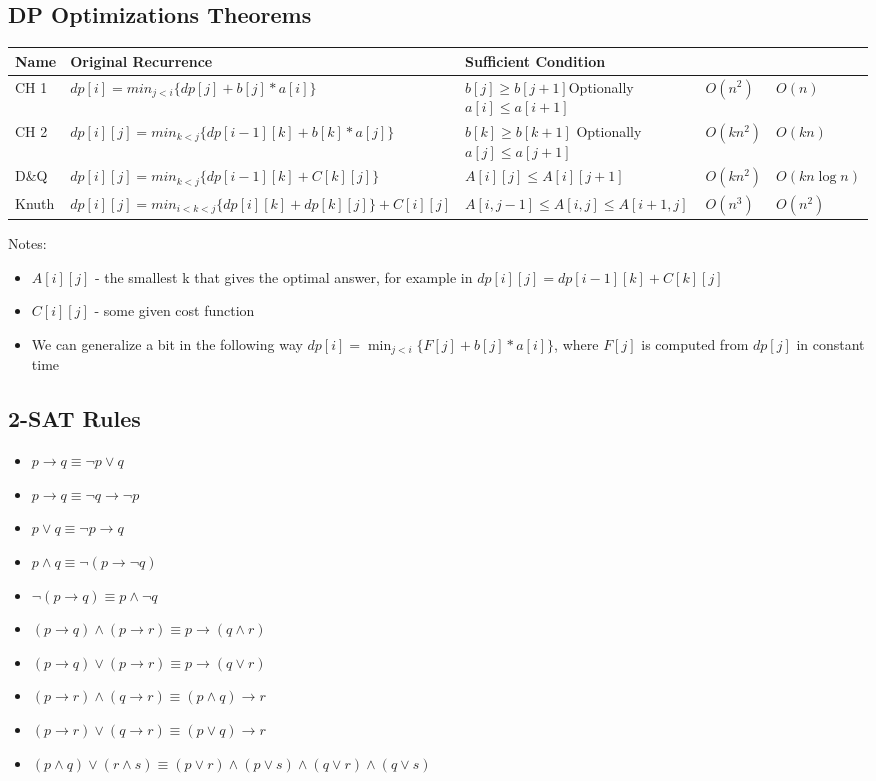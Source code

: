 \documentclass[10pt,letterpaper,twocolumn,twosided]{article}
\begin{document}
\subsection{DP Optimizations Theorems}
\begin{tabular}{|p{0.8cm}| p{4.5cm}| p{3.3cm}|p{0.9cm}| p{1.3cm}|}
	\hline
	Name & Original Recurrence & Sufficient Condition &  &  \\ 
	\hline
	CH 1 & $dp[i] = min_{j<i}\{dp[j] + b[j] * a[i]\}$ & $b[j] \geq b[j+1]$Optionally $a[i] \leq a[i+1]$ & $O(n^2)$ & $O(n)$ \\ 
	\hline
	CH 2 & $dp[i][j] = min_{k<j}\{dp[i-1][k] + b[k] * a[j]\}$ & $b[k] \geq b[k+1]$ Optionally $a[j] \leq a[j+1]$ & $O(kn^2)$ & $O(kn)$ \\ 
	\hline
	D\&Q & $dp[i][j] = min_{k<j}\{dp[i-1][k] + C[k][j]\}$ & $A[i][j] \leq A[i][j+1]$ & $O(kn^2)$ & $O(kn\log n)$ \\ 
	\hline
	Knuth & $dp[i][j] = min_{i<k<j}\{dp[i][k] + dp[k][j]\} + C[i][j]$ & $A[i, j -1] \leq A[i, j] \leq A[i+1, j]$ & $O(n^3)$ & $O(n^2)$ \\ 
	\hline
\end{tabular} 

Notes:

\begin{itemize}
	\item $A[i][j]$ - the smallest k that gives the optimal answer, for example in $dp[i][j] = dp[i-1][k] + C[k][j]$
	\item $C[i][j]$ - some given cost function
	\item We can generalize a bit in the following way $dp[i] = \min_{j<i}\{F[j]+b[j] * a[i]\}$, where $F[j]$ is computed from $dp[j]$ in constant time
\end{itemize}


\subsection{2-SAT Rules}

\begin{itemize}
	\item $ p \rightarrow q \equiv \lnot p \lor q$
	\item $ p \rightarrow q \equiv \lnot q \rightarrow \lnot p$
	\item $ p \lor q \equiv \lnot p \rightarrow q$
	\item $ p \land q \equiv \lnot (p \rightarrow \lnot q)$
	\item $ \lnot (p \rightarrow q) \equiv p \land \lnot q$
	\item $ (p \rightarrow q) \land (p \rightarrow r) \equiv p \rightarrow (q \land r)$
	\item $ (p \rightarrow q) \lor (p \rightarrow r) \equiv p \rightarrow (q \lor r)$
	\item $ (p \rightarrow r) \land (q \rightarrow r) \equiv (p \land q) \rightarrow r$
	\item $ (p \rightarrow r) \lor (q \rightarrow r) \equiv (p \lor q) \rightarrow r$
	\item $(p \land q) \lor (r \land s) \equiv (p \lor r) \land (p \lor s) \land (q \lor r) \land (q \lor s)$
\end{itemize}
\end{document}
